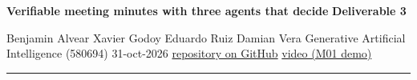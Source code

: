 \documentclass[10pt]{article}
\newcommand{\repo}{https://github.com/benjaminnalvear-dev/genai-vio-meeting-minutes}
\newcommand{\video}{\href{https://www.youtube.com/watch?v=pexxeQTg9Mk}{video (M01 demo)}}
\begin{document}
\sffamily
\fontsize{8.05}{8.95}\selectfont

{\fontsize{13.2}{14.5}\selectfont\bfseries Verifiable meeting minutes with three agents that decide}\hfill
{\normalsize\bfseries Deliverable 3}\par
\vspace{0.5pt}
{\fontsize{7.2}{7.8}\selectfont Benjamin Alvear \textbullet{} Xavier Godoy \textbullet{} Eduardo Ruiz \textbullet{} Damian Vera
\hfill Generative Artificial Intelligence (580694) \textbullet{} 31-oct-2026 \textbullet{} \href{\repo}{repository on GitHub} \textbullet{} \video}

\vspace{2pt}
{\color{blue}\rule{\linewidth}{0.7pt}}\par
\vspace{8pt}
\end{document}

